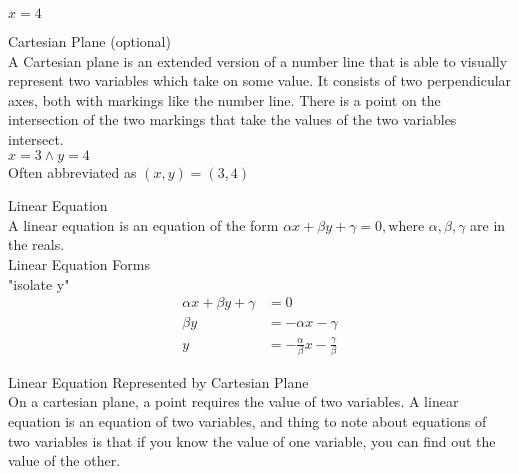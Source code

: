 \documentclass{book}
\begin{document}
  {\example $x = 4$ \\

  }

  {\remark Cartesian Plane (optional) \\
    A Cartesian plane is an extended version of a number line that is able to visually represent two variables which take on some value. It consists of two perpendicular axes, both with markings like the number line. There is a point on the intersection of the two markings that take the values of the two variables intersect.
  }\\

  {\example $x = 3 \land y = 4$ \\
    Often abbreviated as $(x, y) = (3, 4)$
  }

  {\remark Linear Equation \\
    A linear equation is an equation of the form $\alpha x + \beta y + \gamma = 0, \text{where } \alpha, \beta, \gamma$ are in the reals.
  }\\

  {\remark Linear Equation Forms \\
    "isolate y"
    \begin{align*}
      \alpha x + \beta y + \gamma & = 0\\
      \beta y & = - \alpha x - \gamma\\
      y & = -\frac{\alpha}{\beta} x - \frac{\gamma}{\beta}
    \end{align*}
  }

  {\remark Linear Equation Represented by Cartesian Plane \\
    On a cartesian plane, a point requires the value of two variables. A linear equation is an equation of two variables, and thing to note about equations of two variables is that if you know the value of one variable, you can find out the value of the other.
  }\\
\end{document}
